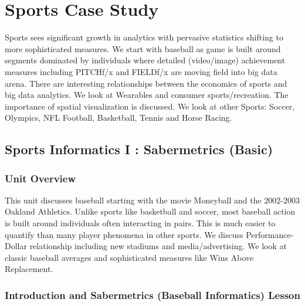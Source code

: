 \begin{fileremark}\currfiledir \currfilename\end{fileremark}

\section{Sports Case Study}\label{sports-case-study}

Sports sees significant growth in analytics with pervasive statistics
shifting to more sophisticated measures. We start with baseball as game
is built around segments dominated by individuals where detailed
(video/image) achievement measures including PITCHf/x and FIELDf/x are
moving field into big data arena. There are interesting relationships
between the economics of sports and big data analytics. We look at
Wearables and consumer sports/recreation. The importance of spatial
visualization is discussed. We look at other Sports: Soccer, Olympics,
NFL Football, Basketball, Tennis and Horse Racing.

\subsection{Sports Informatics I : Sabermetrics
(Basic)}\label{sports-informatics-i-sabermetrics-basic}

\subsubsection{Unit Overview}\label{unit-overview}

This unit discusses baseball starting with the movie Moneyball and the
2002-2003 Oakland Athletics. Unlike sports like basketball and soccer,
most baseball action is built around individuals often interacting in
pairs. This is much easier to quantify than many player phenomena in
other sports. We discuss Performance-Dollar relationship including new
stadiums and media/advertising. We look at classic baseball averages and
sophisticated measures like Wins Above Replacement.




\subsubsection{Introduction and Sabermetrics (Baseball Informatics)
Lesson}\label{introduction-and-sabermetrics-baseball-informatics-lesson}

